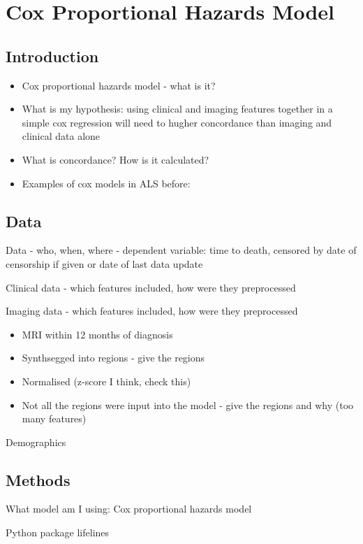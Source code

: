 \chapter{Cox Proportional Hazards Model}
\label{cox_proportional_hazards_model}

\section{Introduction}
\begin{itemize}
    \item Cox proportional hazards model - what is it?
    \item What is my hypothesis: using clinical and imaging features together in a simple cox regression will need to hugher concordance than imaging and clinical data alone
    \item What is concordance? How is it calculated?
    \item Examples of cox models in ALS before:
\end{itemize}

\section{Data}

Data
- who, when, where
- dependent variable: time to death, censored by date of censorship if given or date of last data update

Clinical data - which features included, how were they preprocessed

Imaging data - which features included, how were they preprocessed
\begin{itemize}
    \item MRI within 12 months of diagnosis
    \item Synthsegged into regions - give the regions
    \item Normalised (z-score I think, check this)
    \item Not all the regions were input into the model - give the regions and why (too many features)
\end{itemize}

Demographics

\section{Methods}

What model am I using: Cox proportional hazards model

Python package lifelines

